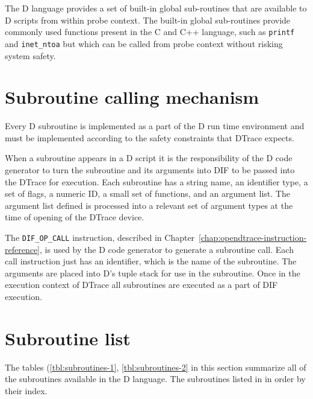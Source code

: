 The D language provides a set of built-in global sub-routines that are
available to D scripts from within probe context.  The built-in global
sub-routines provide commonly used functions present in the C and C++
language, such as \verb|printf| and \verb|inet_ntoa| but which can be
called from probe context without risking system safety.

\section{Subroutine calling mechanism}

Every D subroutine is implemented as a part of the D run time
environment and must be implemented according to the safety constraints
that DTrace expects.

When a subroutine appears in a D script it is the responsibility of
the D code generator to turn the subroutine and its arguments into DIF
to be passed into the DTrace for execution. Each subroutine has a string name,
an identifier type, a set of flags, a numeric ID, a small set of
functions, and an argument list.  The argument list defined is processed
into a relevant set of argument types at the time of opening of the DTrace
device.

The \verb|DIF_OP_CALL| instruction, described in
Chapter~\ref{chap:opendtrace-instruction-reference}, is used by the D
code generator to generate a subroutine call.  Each call instruction just
has an identifier, which is the name of the subroutine. The arguments are
placed into D's tuple stack for use in the subroutine. Once in the
execution context of DTrace all subroutines are executed as a part
of DIF execution.

\section{Subroutine list}
\label{sec:subroutine-list}

The tables (\ref{tbl:subroutines-1}, \ref{tbl:subroutines-2} in this
section summarize all of the subroutines available in the D language.
The subroutines listed in in order by their index.

